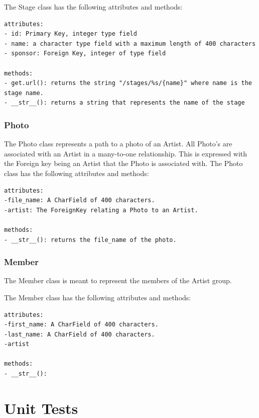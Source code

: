 \documentclass[12pt,english]{scrartcl}
\begin{document}
The Stage class has the following attributes and methods:
\begin{verbatim}
attributes:
- id: Primary Key, integer type field
- name: a character type field with a maximum length of 400 characters
- sponsor: Foreign Key, integer of type field

methods:
- get.url(): returns the string "/stages/%s/{name}" where name is the stage name.
- __str__(): returns a string that represents the name of the stage
\end{verbatim}

\subsubsection{Photo}
The Photo class represents a path to a photo of an Artist. 
All Photo's are associated with an Artist in a many-to-one relationship.
This is expressed with the Foreign key being an Artist that the Photo is associated with. 
The Photo class has the following attributes and methods:
\begin{verbatim}
attributes:
-file_name: A CharField of 400 characters. 
-artist: The ForeignKey relating a Photo to an Artist.

methods:
- __str__(): returns the file_name of the photo.
\end{verbatim}

\subsubsection{Member}
The Member class is meant to represent the members of the Artist group. 

The Member class has the following attributes and methods:
\begin{verbatim}
attributes:
-first_name: A CharField of 400 characters. 
-last_name: A CharField of 400 characters.
-artist 

methods:
- __str__(): 
\end{verbatim}

\section{Unit Tests}
\end{document}
